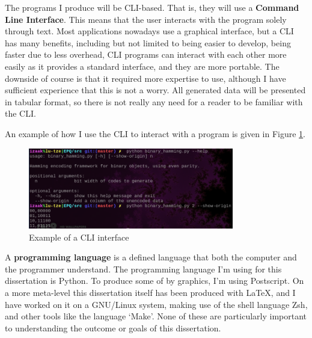 \documentclass[a4paper,11pt]{article}
\begin{document}
    \begin{definition}
    The programs I produce will be CLI-based. That is, they will use a
    \textbf{Command Line Interface}. This means that the user interacts with the
    program solely through text. Most applications nowadays use a graphical
    interface, but a CLI has many benefits, including but not limited to being
    easier to develop, being faster due to less overhead, CLI programs can
    interact with each other more easily as it provides a standard interface,
    and they are more portable. The downside of course is that it required more
    expertise to use, although I have sufficient experience that this is not a
    worry. All generated data will be presented in tabular format, so there is
    not really any need for a reader to be familiar with the CLI.

    An example of how I use the CLI to interact with a program is given in
    Figure \ref{figcliusage}.
    \end{definition}

\begin{figure}[H]
\begin{center}
\includegraphics[width=0.8\textwidth]{../images/cli_usage.png}
\end{center}
\caption{Example of a CLI interface}\label{figcliusage}
\end{figure}

    \begin{definition}
    A \textbf{programming language} is a defined language that both the computer
    and the programmer understand.  The programming language I'm using for this
    dissertation is Python. To produce some of by graphics, I'm using
    Postscript. On a more meta-level this dissertation itself has been produced
    with \LaTeX, and I have worked on it on a GNU/Linux system, making use of
    the shell language Zsh, and other tools like the language `Make'. None of
    these are particularly important to understanding the outcome or goals of
    this dissertation.
    \end{definition}
\end{document}
